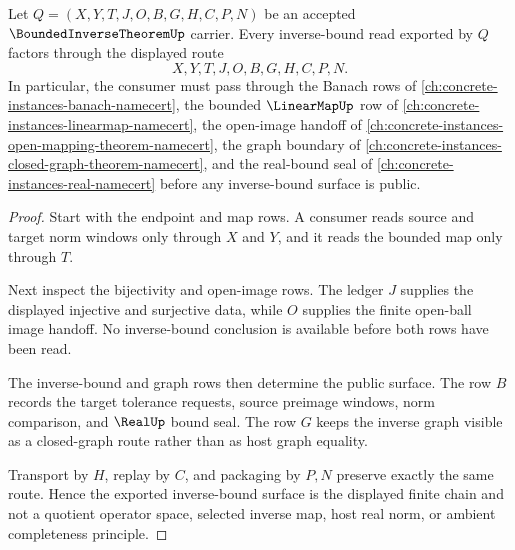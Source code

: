 \begin{theorem}
\label{thm:bounded-inverse-theorem-open-mapping-route}
Let $Q=(X,Y,T,J,O,B,G,H,C,P,N)$ be an accepted $\BoundedInverseTheoremUp$ carrier. Every inverse-bound read exported by $Q$ factors through the displayed route
$$
X,Y,T,J,O,B,G,H,C,P,N .
$$
In particular, the consumer must pass through the Banach rows of \autoref{ch:concrete-instances-banach-namecert}, the bounded $\LinearMapUp$ row of \autoref{ch:concrete-instances-linearmap-namecert}, the open-image handoff of \autoref{ch:concrete-instances-open-mapping-theorem-namecert}, the graph boundary of \autoref{ch:concrete-instances-closed-graph-theorem-namecert}, and the real-bound seal of \autoref{ch:concrete-instances-real-namecert} before any inverse-bound surface is public.
\end{theorem}
\begin{proof}
Start with the endpoint and map rows. A consumer reads source and target norm windows only through $X$ and $Y$, and it reads the bounded map only through $T$.

Next inspect the bijectivity and open-image rows. The ledger $J$ supplies the displayed injective and surjective data, while $O$ supplies the finite open-ball image handoff. No inverse-bound conclusion is available before both rows have been read.

The inverse-bound and graph rows then determine the public surface. The row $B$ records the target tolerance requests, source preimage windows, norm comparison, and $\RealUp$ bound seal. The row $G$ keeps the inverse graph visible as a closed-graph route rather than as host graph equality.

Transport by $H$, replay by $C$, and packaging by $P,N$ preserve exactly the same route. Hence the exported inverse-bound surface is the displayed finite chain and not a quotient operator space, selected inverse map, host real norm, or ambient completeness principle.
\end{proof}

